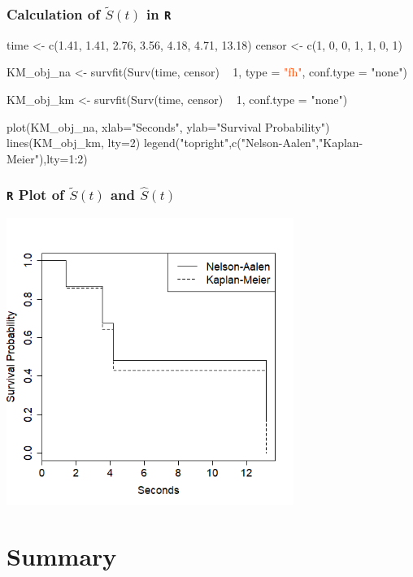 \begin{frame}[fragile]
\frametitle{Calculation of $\tilde{S}(t)$ in \texttt{R}}
\begin{RcodeTiny}{.0}
time <- c(1.41, 1.41, 2.76, 3.56, 4.18, 4.71, 13.18)
censor <- c(1, 0, 0, 1, 1, 0, 1)

KM_obj_na <- survfit(Surv(time, censor) ~ 1,
                     type = \textcolor{OrangeRed}{"fh"},
                     conf.type = "none")

KM_obj_km <- survfit(Surv(time, censor) ~ 1,
                     conf.type = "none")

plot(KM_obj_na, xlab="Seconds", ylab="Survival Probability")
lines(KM_obj_km, lty=2)
legend("topright",c("Nelson-Aalen","Kaplan-Meier"),lty=1:2)
\end{RcodeTiny}
\end{frame}

\begin{frame}
\frametitle{\texttt{R} Plot of $\tilde{S}(t)$ and $\widehat{S}(t)$}
\includegraphics[width=0.70\textwidth]{Figures/KM_St_na_km.png}
\end{frame}

\section[Summary]{Summary}
\subsection{}
\begin{frame}
\end{frame}


